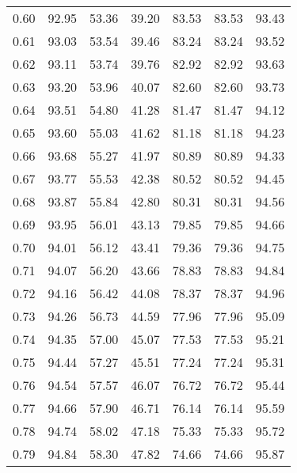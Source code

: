 \begin{tabular}{|c|c|c|c|c|c|c|}
      0.60 &     92.95 &     53.36 &      39.20 &   83.53 &      83.53 &         93.43 \\
      0.61 &     93.03 &     53.54 &      39.46 &   83.24 &      83.24 &         93.52 \\
      0.62 &     93.11 &     53.74 &      39.76 &   82.92 &      82.92 &         93.63 \\
      0.63 &     93.20 &     53.96 &      40.07 &   82.60 &      82.60 &         93.73 \\
      0.64 &     93.51 &     54.80 &      41.28 &   81.47 &      81.47 &         94.12 \\
      0.65 &     93.60 &     55.03 &      41.62 &   81.18 &      81.18 &         94.23 \\
      0.66 &     93.68 &     55.27 &      41.97 &   80.89 &      80.89 &         94.33 \\
      0.67 &     93.77 &     55.53 &      42.38 &   80.52 &      80.52 &         94.45 \\
      0.68 &     93.87 &     55.84 &      42.80 &   80.31 &      80.31 &         94.56 \\
      0.69 &     93.95 &     56.01 &      43.13 &   79.85 &      79.85 &         94.66 \\
      0.70 &     94.01 &     56.12 &      43.41 &   79.36 &      79.36 &         94.75 \\
      0.71 &     94.07 &     56.20 &      43.66 &   78.83 &      78.83 &         94.84 \\
      0.72 &     94.16 &     56.42 &      44.08 &   78.37 &      78.37 &         94.96 \\
      0.73 &     94.26 &     56.73 &      44.59 &   77.96 &      77.96 &         95.09 \\
      0.74 &     94.35 &     57.00 &      45.07 &   77.53 &      77.53 &         95.21 \\
      0.75 &     94.44 &     57.27 &      45.51 &   77.24 &      77.24 &         95.31 \\
      0.76 &     94.54 &     57.57 &      46.07 &   76.72 &      76.72 &         95.44 \\
      0.77 &     94.66 &     57.90 &      46.71 &   76.14 &      76.14 &         95.59 \\
      0.78 &     94.74 &     58.02 &      47.18 &   75.33 &      75.33 &         95.72 \\
      0.79 &     94.84 &     58.30 &      47.82 &   74.66 &      74.66 &         95.87 \\

\end{tabular}
